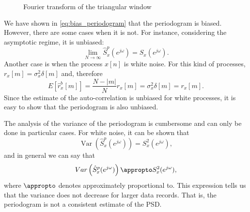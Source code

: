 \begin{figure}
	\begin{center}
	\end{center}
	\caption{Fourier transform of the triangular window}
	\label{fig:FT_triangularwindow}
\end{figure}

We have shown in \eqref{eq:bias_periodogram} that the periodogram is biased. However, there are some cases when it is not. For instance, considering the asymptotic regime, it is unbiased:
\begin{equation*}
\lim_{N \rightarrow \infty} \hat{S}_x^{p}(e^{j \omega}) = S_x(e^{j \omega}).
\end{equation*}
Another case is when the process $x[n]$ is white noise. For this kind of processes, $r_{x}[m] = \sigma^2_x \delta[m]$ and, therefore
\begin{equation*}
E\left[\hat{r}_{x}^{b}[m]\right]  = \frac{N - |m|}{N} r_{x}[m] = \sigma^2_x \delta[m] = r_{x}[m].
\end{equation*}
Since the estimate of the auto-correlation is unbiased for white processes, it is easy to show that the periodogram is also unbiased.

The analysis of the variance of the periodogram is cumbersome and can only be done in particular cases. For white noise, it can be shown that
\begin{equation*}
 \mathop{Var}\left(\hat{S}_x^{p}(e^{j \omega})\right) = S_x^{2}(e^{j \omega}),
\end{equation*}
and in general we can say that
\begin{equation*}
\mathop{Var}\left(\hat{S}_x^{p}(e^{j \omega})\right) \appropto S_x^{2}(e^{j \omega}),
\end{equation*}
where $\appropto$ denotes approximately proportional to.  This expression tells us that the variance does not decrease for larger data records. That is, the periodogram is not a consistent estimate of the PSD.

